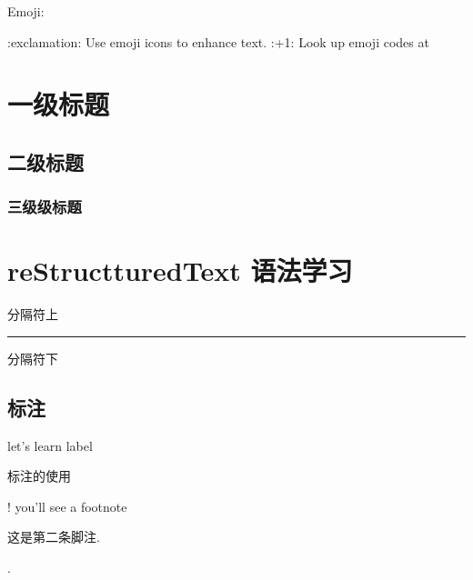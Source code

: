 \documentclass[letterpaper,10pt,english]{sphinxmanual}
\begin{document}
\sphinxAtStartPar
Emoji:

\sphinxAtStartPar
:exclamation: Use emoji icons to enhance text. :+1:  Look up emoji codes at 

\begin{sphinxVerbatim}[commandchars=\\\{\}]
      
\end{sphinxVerbatim}
\label{\detokenize{rst-text:rst-text}}
\sphinxAtStartPar
{}

\sphinxAtStartPar
{}


\chapter{一级标题}
\label{\detokenize{rst-text:id1}}\label{\detokenize{rst-text::doc}}

\section{二级标题}
\label{\detokenize{rst-text:id2}}

\subsection{三级级标题}
\label{\detokenize{rst-text:id3}}

\chapter{reStructturedText 语法学习}
\label{\detokenize{rst-text:restructturedtext}}
\sphinxAtStartPar
分隔符上


\bigskip\hrule\bigskip


\sphinxAtStartPar
分隔符下


\section{标注}
\label{\detokenize{rst-text:id4}}
\sphinxAtStartPar
let’s learn label %
\begin{footnote}[1]\sphinxAtStartFootnote
标注的使用
%
\end{footnote} ! you’ll see a footnote %
\begin{footnote}[2]\sphinxAtStartFootnote
这是第二条脚注.
%
\end{footnote} .
\end{document}
